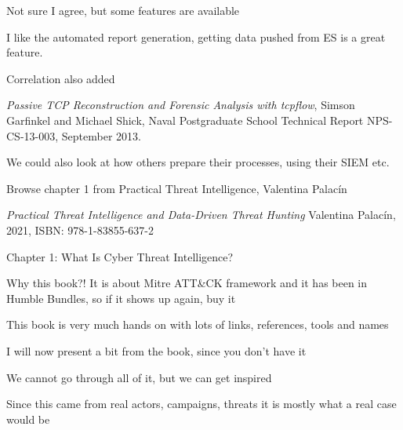 \documentclass[Screen16to9,17pt]{foils}
\begin{document}
\begin{list2}
\item Not sure I agree, but some features are available
\item I like the automated report generation, getting data pushed from ES is a great feature.
\item Correlation also added

\end{list2}





\begin{list2}
  \item {}
  \item \emph{Passive TCP Reconstruction and Forensic Analysis with tcpflow}, Simson Garfinkel and Michael Shick, Naval Postgraduate School Technical Report NPS-CS-13-003, September 2013.
\end{list2}




We could also look at how others prepare their processes, using their SIEM etc.

Browse chapter 1 from Practical Threat Intelligence, Valentina Palacín

\emph{Practical Threat Intelligence and Data-Driven Threat Hunting}
Valentina Palacín, 2021, ISBN: 978-1-83855-637-2

\begin{list2}
\item Chapter 1: What Is Cyber Threat Intelligence?
\item Why this book?! It is about Mitre ATT\&CK framework and it has been in Humble Bundles, so if it shows up again, buy it
\item This book is very much hands on with lots of links, references, tools and names
\item I will now present a bit from the book, since you don't have it
\end{list2}



\begin{list2}
\item We cannot go through all of it, but we can get inspired
\item Since this came from real actors, campaigns, threats it is mostly what a real case would be
\end{list2}
\end{document}
